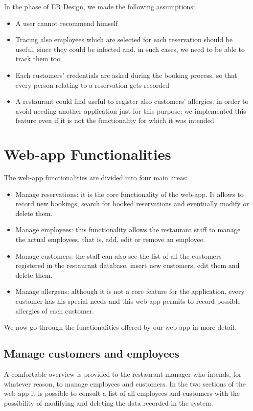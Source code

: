 \documentclass{article}
\begin{document}
\vspace{5mm}
In the phase of ER Design, we made the following assumptions:
\begin{itemize}
  \item A user cannot recommend himself
  \item Tracing also employees which are selected for each reservation should be useful, since they could be infected and, in such cases, we need to be able to track them too
  \item Each customers' credentials are asked during the booking process, so that every person relating to a reservation gets recorded
  \item A restaurant could find useful to register also customers' allergies, 
  in order to avoid needing another application just for this purpose: we implemented this feature even if it is not the functionality for which it was intended
\end{itemize}

\newpage

\section*{Web-app Functionalities}
The web-app functionalities are divided into four main areas:
\begin{itemize}
    \item Manage reservations: it is the core functionality of the web-app. It allows
      to record new bookings, search for booked reservations and eventually 
       modify or delete them.
    \item Manage employees: this functionality allows the restaurant staff to manage the actual employees, that is, add, edit or remove an employee.
    \item Manage customers: the staff can also see the list of all the customers registered in the restaurant database, insert new customers, edit them and delete them.
    \item Manage allergens: although it is not a core feature for the application, every customer has his special needs and this web-app permits to record possible allergies of each customer.
\end{itemize}


We now go through the functionalities offered by our web-app in more detail.

\subsection*{Manage customers and employees}
A comfortable overview is provided to the restaurant manager who intends, for whatever reason, to manage employees and customers. In the two sections of the web app it is possible to consult a list of all employees and customers with the possibility of modifying and deleting the data recorded in the system.
\end{document}
